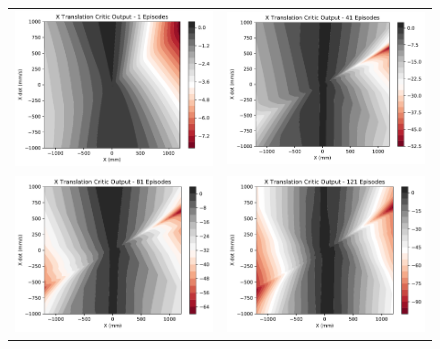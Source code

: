 \begin{figure}
	\begin{tabular}{cc}
		\includegraphics[width=65mm]{figures/train_figs/transx_critic/Critic1_1.pdf} &  
		\includegraphics[width=65mm]{figures/train_figs/transx_critic/Critic1_41.pdf} \\
		\includegraphics[width=65mm]{figures/train_figs/transx_critic/Critic1_81.pdf} &   \includegraphics[width=65mm]{figures/train_figs/transx_critic/Critic1_121.pdf} \\

\end{tabular}
\end{figure}
